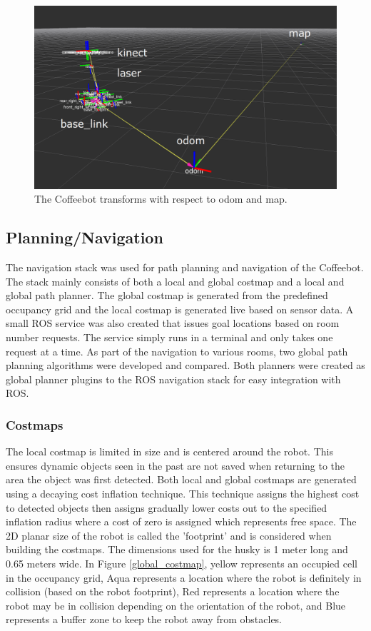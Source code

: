\documentclass[letterpaper, 10 pt, conference]{ieeeconf}  %
\begin{document}
	\begin{figure}[!ht]
		\centering
		\includegraphics[width=1.0\columnwidth]{Figures/Transforms}
		\caption{The Coffeebot transforms with respect to odom and map.}
		\label{transforms}
	\end{figure}

\subsection{Planning/Navigation}

The navigation stack was used for path planning and navigation of the Coffeebot. The stack mainly consists of both a local and global costmap and a local and global path planner. The global costmap is generated from the predefined occupancy grid and the local costmap is generated live based on sensor data. A small ROS service was also created that issues goal locations based on room number requests. The service simply runs in a terminal and only takes one request at a time. As part of the navigation to various rooms, two global path planning algorithms were developed and compared. Both planners were created as global planner plugins to the ROS navigation stack for easy integration with ROS.

\subsubsection{Costmaps}

The local costmap is limited in size and is centered around the robot. This ensures dynamic objects seen in the past are not saved when returning to the area the object was first detected. Both local and global costmaps are generated using a decaying cost inflation technique. This technique assigns the highest cost to detected objects then assigns gradually lower costs out to the specified inflation radius where a cost of zero is assigned which represents free space. The 2D planar size of the robot is called the 'footprint' and is considered when building the costmaps. The dimensions used for the husky is 1 meter long and 0.65 meters wide. In Figure \ref{global_costmap}, yellow represents an occupied cell in the occupancy grid, Aqua represents a location where the robot is definitely in collision (based on the robot footprint), Red represents a location where the robot may be in collision depending on the orientation of the robot, and Blue represents a buffer zone to keep the robot away from obstacles.
\end{document}
